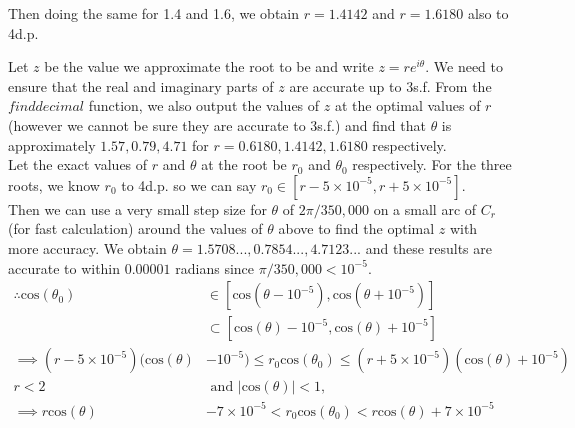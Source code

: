 \documentclass[12pt, a4paper]{article}
\begin{document}
Then doing the same for 1.4 and 1.6, we obtain $r = 1.4142$ and $r = 1.6180$ also to 4d.p. \vspace{0.2cm}%

Let $z$ be the value we approximate the root to be and write  $z = re^{i\theta}$. We need to ensure that the real and imaginary parts of $z$ are accurate up to 3s.f. From the $find$\textunderscore$decimal$ function, we also output the values of $z$ at the optimal values of $r$ (however we cannot be sure they are accurate to 3s.f.) and find that $\theta$ is approximately $1.57, 0.79, 4.71$ for $r = 0.6180, 1.4142, 1.6180$ respectively. \vspace{0.2cm} \\
Let the exact values of $r$ and $\theta$ at the root be $r_{0}$ and $\theta_{0}$ respectively. For the three roots, we know $r_0$ to 4d.p. so we can say $r_{0}\in[r-5\times10^{-5}, r+5\times10^{-5}]$.
\vspace{0.2cm}\\
Then we can use a very small step size for $\theta$ of $2\pi/350,000$ on a small arc of $C_{r}$ (for fast calculation) around the values of $\theta$ above to find the optimal $z$ with more accuracy. We obtain $\theta = 1.5708..., 0.7854..., 4.7123...$ and these results are accurate to within $0.00001$ radians since $\pi/350,000<10^{-5}$.
\begin{align}
	\therefore \text{cos}(\theta_{0})&\in[\text{cos}(\theta-10^{-5}), \text{cos}(\theta+10^{-5})] \nonumber\\
	&\subset[{\text{cos}(\theta)-10^{-5}, \text{cos}(\theta)+10^{-5}}]\nonumber\\
	\implies(r-5\times10^{-5})(\text{cos}(\theta)&-10^{-5})\leq r_{0}\text{cos}(\theta_{0})\leq (r+5\times10^{-5})(\text{cos}(\theta)+10^{-5}) \nonumber\\
	r<2 &\text{ and } |\text{cos}(\theta)|<1,  \nonumber\\
	\implies  r\text{cos}(\theta)&-7\times10^{-5} < r_{0}\text{cos}(\theta_{0}) < r\text{cos}(\theta)+7\times10^{-5} \nonumber
\end{align}
\end{document}
